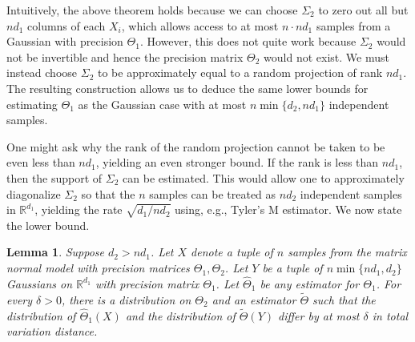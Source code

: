 \documentclass[aos]{imsart}
\newtheorem{lemma}[theorem]{Lemma}
\theoremstyle{definition}
\numberwithin{equation}{section}
\newcommand{\R}{{\mathbb{R}}}
\begin{document}
Intuitively, the above theorem holds because we can choose $\Sigma_2$ to zero out all but $nd_1$ columns of each $X_i$, which allows access to at most $n \cdot n d_1$ samples from a Gaussian with precision $\Theta_1$. However, this does not quite work because $\Sigma_2$ would not be invertible and hence the precision matrix $\Theta_2$ would not exist. We must instead choose $\Sigma_2$ to be approximately equal to a random projection of rank $n d_1$. The resulting construction allows us to deduce the same lower bounds for estimating $\Theta_1$ as the Gaussian case with at most $n\min \{d_2, n d_1\}$ independent samples.

One might ask why the rank of the random projection cannot be taken to be even less than $n d_1$, yielding an even stronger bound. If the rank is less than $n d_1$, then the support of $\Sigma_2$ can be estimated. This would allow one to approximately diagonalize $\Sigma_2$ so that the $n$ samples can be treated as $nd_2$ independent samples in $\R^{d_1}$, yielding the rate $\sqrt{d_1 / n d_2}$ using, e.g., Tyler's M estimator. We now state the lower bound.


\begin{lemma}\label{lem:reduce-lower}Suppose $d_2 > n d_1$. Let $X$ denote a tuple of $n$ samples from the matrix normal model with precision matrices $\Theta_1, \Theta_2$. Let $Y$ be a tuple of $n\min\{nd_1, d_2\}$ Gaussians on $\R^{d_1}$ with precision matrix $\Theta_1$. Let $\widehat{\Theta}_1$ be any estimator for $\Theta_1$. For every $\delta > 0$, there is a distribution on $\Theta_2$ and an estimator $\tilde{\Theta}$ such that the distribution of $\widehat{\Theta}_1(X)$ and the distribution of $\tilde{\Theta}(Y)$ differ by at most $\delta$ in total variation distance. 
\end{lemma}
\end{document}

